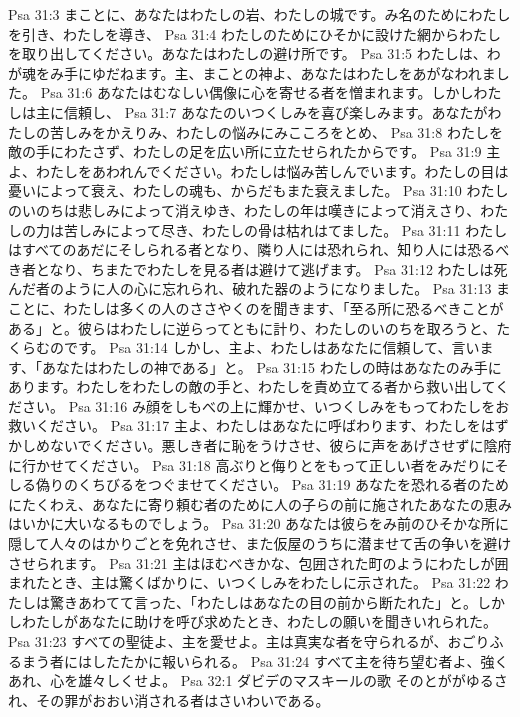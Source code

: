 Psa 31:3  まことに、あなたはわたしの岩、わたしの城です。み名のためにわたしを引き、わたしを導き、
Psa 31:4  わたしのためにひそかに設けた網からわたしを取り出してください。あなたはわたしの避け所です。
Psa 31:5  わたしは、わが魂をみ手にゆだねます。主、まことの神よ、あなたはわたしをあがなわれました。
Psa 31:6  あなたはむなしい偶像に心を寄せる者を憎まれます。しかしわたしは主に信頼し、
Psa 31:7  あなたのいつくしみを喜び楽しみます。あなたがわたしの苦しみをかえりみ、わたしの悩みにみこころをとめ、
Psa 31:8  わたしを敵の手にわたさず、わたしの足を広い所に立たせられたからです。
Psa 31:9  主よ、わたしをあわれんでください。わたしは悩み苦しんでいます。わたしの目は憂いによって衰え、わたしの魂も、からだもまた衰えました。
Psa 31:10  わたしのいのちは悲しみによって消えゆき、わたしの年は嘆きによって消えさり、わたしの力は苦しみによって尽き、わたしの骨は枯れはてました。
Psa 31:11  わたしはすべてのあだにそしられる者となり、隣り人には恐れられ、知り人には恐るべき者となり、ちまたでわたしを見る者は避けて逃げます。
Psa 31:12  わたしは死んだ者のように人の心に忘れられ、破れた器のようになりました。
Psa 31:13  まことに、わたしは多くの人のささやくのを聞きます、「至る所に恐るべきことがある」と。彼らはわたしに逆らってともに計り、わたしのいのちを取ろうと、たくらむのです。
Psa 31:14  しかし、主よ、わたしはあなたに信頼して、言います、「あなたはわたしの神である」と。
Psa 31:15  わたしの時はあなたのみ手にあります。わたしをわたしの敵の手と、わたしを責め立てる者から救い出してください。
Psa 31:16  み顔をしもべの上に輝かせ、いつくしみをもってわたしをお救いください。
Psa 31:17  主よ、わたしはあなたに呼ばわります、わたしをはずかしめないでください。悪しき者に恥をうけさせ、彼らに声をあげさせずに陰府に行かせてください。
Psa 31:18  高ぶりと侮りとをもって正しい者をみだりにそしる偽りのくちびるをつぐませてください。
Psa 31:19  あなたを恐れる者のためにたくわえ、あなたに寄り頼む者のために人の子らの前に施されたあなたの恵みはいかに大いなるものでしょう。
Psa 31:20  あなたは彼らをみ前のひそかな所に隠して人々のはかりごとを免れさせ、また仮屋のうちに潜ませて舌の争いを避けさせられます。
Psa 31:21  主はほむべきかな、包囲された町のようにわたしが囲まれたとき、主は驚くばかりに、いつくしみをわたしに示された。
Psa 31:22  わたしは驚きあわてて言った、「わたしはあなたの目の前から断たれた」と。しかしわたしがあなたに助けを呼び求めたとき、わたしの願いを聞きいれられた。
Psa 31:23  すべての聖徒よ、主を愛せよ。主は真実な者を守られるが、おごりふるまう者にはしたたかに報いられる。
Psa 31:24  すべて主を待ち望む者よ、強くあれ、心を雄々しくせよ。
Psa 32:1  ダビデのマスキールの歌 そのとががゆるされ、その罪がおおい消される者はさいわいである。
